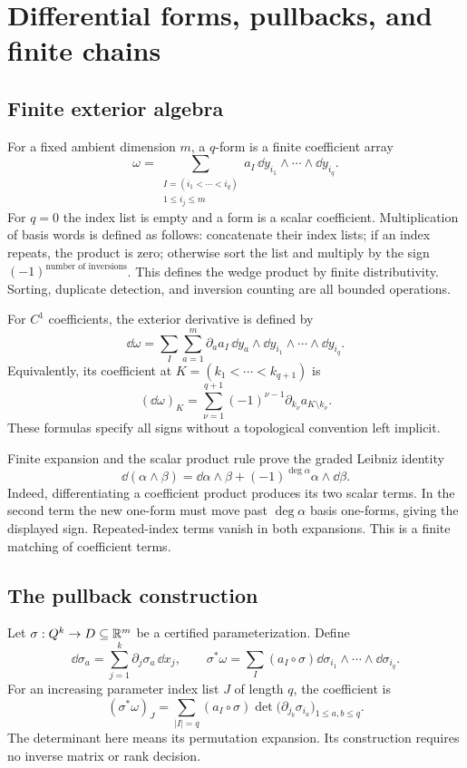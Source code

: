 \section{Differential forms, pullbacks, and finite chains}\label{sec:geometry}

\subsection{Finite exterior algebra}

For a fixed ambient dimension $m$, a $q$-form is a finite coefficient array
\[
 \omega=\sum_{\substack{I=(i_1<\cdots<i_q)\\1\le i_j\le m}}
                   a_I\,\dd y_{i_1}\wedge\cdots\wedge\dd y_{i_q}.
\]
For $q=0$ the index list is empty and a form is a scalar coefficient.
Multiplication of basis words is defined as follows: concatenate their
index lists; if an index repeats, the product is zero; otherwise sort the
list and multiply by the sign $(-1)^{\text{number of inversions}}$.
This defines the wedge product by finite distributivity. Sorting,
duplicate detection, and inversion counting are all bounded operations.

For $C^1$ coefficients, the exterior derivative is defined by
\[
 \dd\omega=\sum_I\sum_{a=1}^m
          \partial_a a_I\,\dd y_a\wedge\dd y_{i_1}\wedge\cdots\wedge\dd y_{i_q}.
\]
Equivalently, its coefficient at $K=(k_1<\cdots<k_{q+1})$ is
\[
 (\dd\omega)_K
   =\sum_{\nu=1}^{q+1}(-1)^{\nu-1}
        \partial_{k_\nu}a_{K\setminus k_\nu}.
\]
These formulas specify all signs without a topological convention left
implicit.

Finite expansion and the scalar product rule prove the graded Leibniz
identity
\[
 \dd(\alpha\wedge\beta)
 =\dd\alpha\wedge\beta+(-1)^{\deg\alpha}\alpha\wedge\dd\beta.
\]
Indeed, differentiating a coefficient product produces its two scalar
terms. In the second term the new one-form must move past
$\deg\alpha$ basis one-forms, giving the displayed sign. Repeated-index
terms vanish in both expansions. This is a finite matching of coefficient
terms.

\subsection{The pullback construction}

Let $\sigma:Q^k\to D\subseteq\mathbb R^m$ be a certified parameterization.
Define
\[
 \dd\sigma_a=\sum_{j=1}^k\partial_j\sigma_a\,\dd x_j,\qquad
 \sigma^*\omega=\sum_I(a_I\circ\sigma)
                  \dd\sigma_{i_1}\wedge\cdots\wedge\dd\sigma_{i_q}.
\]
For an increasing parameter index list $J$ of length $q$, the coefficient
is
\begin{equation}\label{eq:pullback-minors}
 (\sigma^*\omega)_J
 =\sum_{|I|=q}(a_I\circ\sigma)
        \det\bigl(\partial_{j_b}\sigma_{i_a}\bigr)_{1\le a,b\le q}.
\end{equation}
The determinant here means its permutation expansion. Its construction
requires no inverse matrix or rank decision.

